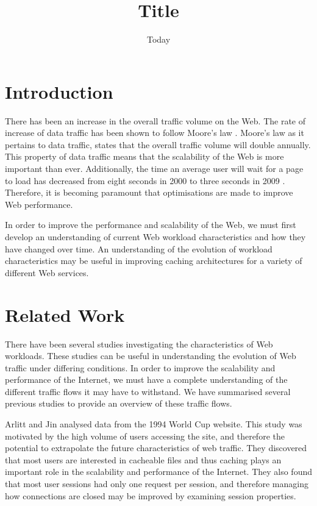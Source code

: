 \documentclass[10pt,conference]{IEEEtran}
\title{Title}
\author{\IEEEauthorblockN{Chelsea Farley, Ryan Lewis, David Armstrong, Rina Gao and Ryunosuke Madenokoji}
\IEEEauthorblockA{The University of Auckland}}
\date{Today}
\begin{document}
\maketitle

\begin{abstract}
\end{abstract}

\section{Introduction}
There has been an increase in the overall traffic volume on the Web. The rate of increase of data traffic has been shown to follow Moore's law \cite{williams05}. Moore's law as it pertains to data traffic, states that the overall traffic volume will double annually. This property of data traffic means that the scalability of the Web is more important than ever. Additionally, the time an average user will wait for a page to load has decreased from eight seconds in 2000 to three seconds in 2009 \cite{Butkiewicz}. Therefore, it is becoming paramount that optimisations are made to improve Web performance.

In order to improve the performance and scalability of the Web, we must first develop an understanding of current Web workload characteristics and how they have changed over time. An understanding of the evolution of workload characteristics may be useful in improving caching architectures for a variety of different Web services.

\section{Related Work}
There have been several studies investigating the characteristics of Web workloads. These studies can be useful in understanding the evolution of Web traffic under differing conditions. In order to improve the scalability and performance of the Internet, we must have a complete understanding of the different traffic flows it may have to withstand. We have summarised several previous studies to provide an overview of these traffic flows. 

Arlitt and Jin \cite{world_cup} analysed data from the 1994 World Cup website. This study was motivated by the high volume of users accessing the site, and therefore the potential to extrapolate the future characteristics of web traffic. They discovered that most users are interested in cacheable files and thus caching plays an important role in the scalability and performance of the Internet. They also found that most user sessions had only one request per session, and therefore managing how connections are closed may be improved by examining session properties.
\end{document}
